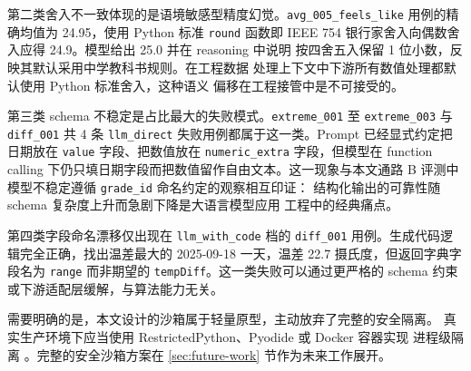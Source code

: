 第二类舍入不一致体现的是语境敏感型精度幻觉。\texttt{avg\_\bk{}005\_\bk{}feels\_\bk{}like}
用例的精确均值为 24.95，使用 Python 标准 \texttt{round} 函数即 IEEE 754
银行家舍入向偶数舍入应得 24.9。模型给出 25.0 并在 reasoning 中说明
按四舍五入保留 1 位小数，反映其默认采用中学教科书规则。在工程数据
处理上下文中下游所有数值处理都默认使用 Python 标准舍入，这种语义
偏移在工程接管中是不可接受的。

第三类 schema 不稳定是占比最大的失败模式。\texttt{extreme\_\bk{}001} 至
\texttt{extreme\_\bk{}003} 与 \texttt{diff\_\bk{}001} 共 4 条 \texttt{llm\_\bk{}direct}
失败用例都属于这一类。Prompt 已经显式约定把日期放在 \texttt{value}
字段、把数值放在 \texttt{numeric\_\bk{}extra} 字段，但模型在 function
calling 下仍只填日期字段而把数值留作自由文本。这一现象与本文通路 B
评测中模型不稳定遵循 \texttt{grade\_\bk{}id} 命名约定的观察相互印证：
结构化输出的可靠性随 schema 复杂度上升而急剧下降是大语言模型应用
工程中的经典痛点。

第四类字段命名漂移仅出现在 \texttt{llm\_\bk{}with\_\bk{}code} 档的
\texttt{diff\_\bk{}001} 用例。生成代码逻辑完全正确，找出温差最大的
2025-09-18 一天，温差 22.7 摄氏度，但返回字典字段名为 \texttt{range}
而非期望的 \texttt{tempDiff}。这一类失败可以通过更严格的 schema 约束
或下游适配层缓解，与算法能力无关。

需要明确的是，本文设计的沙箱属于轻量原型，主动放弃了完整的安全隔离。
真实生产环境下应当使用 RestrictedPython、Pyodide 或 Docker 容器实现
进程级隔离 \cite{ref23}。完整的安全沙箱方案在 \ref{sec:future-work}
节作为未来工作展开。

